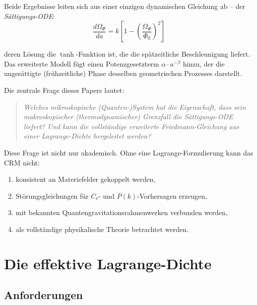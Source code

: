\documentclass[11pt,a4paper]{article}
\begin{document}
Beide Ergebnisse leiten sich aus einer einzigen dynamischen Gleichung ab -- der \textit{S\"attigungs-ODE}:
\begin{equation}
\frac{d\Omega_\Phi}{da} = k \left[1 - \left(\frac{\Omega_\Phi}{\Phi_0}\right)^2\right]
\label{eq:saturation_ode}
\end{equation}

deren L\"osung die $\tanh$-Funktion ist, die die sp\"atzeitliche Beschleunigung liefert. Das erweiterte Modell f\"ugt einen Potenzgesetzterm $\alpha \cdot a^{-\beta}$ hinzu, der die unges\"attigte (fr\"uhzeitliche) Phase desselben geometrischen Prozesses darstellt.

Die zentrale Frage dieses Papers lautet:

\begin{quote}
\textit{Welches mikroskopische (Quanten-)System hat die Eigenschaft, dass sein makroskopischer (thermodynamischer) Grenzfall die S\"attigungs-ODE liefert? Und kann die vollst\"andige erweiterte Friedmann-Gleichung aus einer Lagrange-Dichte hergeleitet werden?}
\end{quote}

Diese Frage ist nicht nur akademisch. Ohne eine Lagrange-Formulierung kann das CRM nicht:
\begin{enumerate}
\item konsistent an Materiefelder gekoppelt werden,
\item St\"orungsgleichungen f\"ur $C_\ell$- und $P(k)$-Vorhersagen erzeugen,
\item mit bekannten Quantengravitationsrahmenwerken verbunden werden,
\item als vollst\"andige physikalische Theorie betrachtet werden.
\end{enumerate}


\section{Die effektive Lagrange-Dichte}
\label{sec:lagrangian}

\subsection{Anforderungen}
\end{document}
